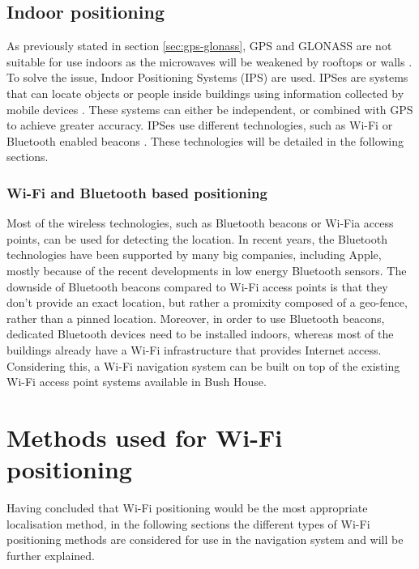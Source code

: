 \subsection{Indoor positioning}
\label{sec:indoor-positioning}

As previously stated in section \ref{sec:gps-glonass}, GPS and GLONASS are not suitable for use indoors as the microwaves will be weakened by rooftops or walls
\cite{gps-indoor-precision}. To solve the issue, Indoor Positioning Systems (IPS) are used. IPSes are systems that can locate objects or people inside buildings using information collected by mobile devices \cite{ips-definition}. These systems can either be independent, or combined with GPS to achieve greater accuracy. IPSes use different technologies, such as Wi-Fi or Bluetooth enabled beacons \cite{ips-definition}. These technologies will be detailed in the following sections.

\subsubsection{Wi-Fi and Bluetooth based positioning}
\label{sec:wifi-positioning}

Most of the wireless technologies, such as Bluetooth beacons or Wi-Fia access points, can be used for detecting the location. In recent years, the Bluetooth technologies have been supported by many big companies, including Apple, mostly because of the recent developments in low energy Bluetooth sensors. The downside of Bluetooth beacons compared to Wi-Fi access points is that they don't provide an exact location, but rather a promixity composed of a geo-fence, rather than a pinned location. Moreover, in order to use Bluetooth beacons, dedicated Bluetooth devices need to be installed indoors, whereas most of the buildings already have a Wi-Fi infrastructure that provides Internet access. Considering this, a Wi-Fi navigation system can be built on top of the existing Wi-Fi access point systems available in Bush House.

\section{Methods used for Wi-Fi positioning}
\label{sec:methods-wifi-pos}
Having concluded that Wi-Fi positioning would be the most appropriate localisation method, in the following sections the different types of Wi-Fi positioning methods are considered for use in the navigation system and will be further explained.

